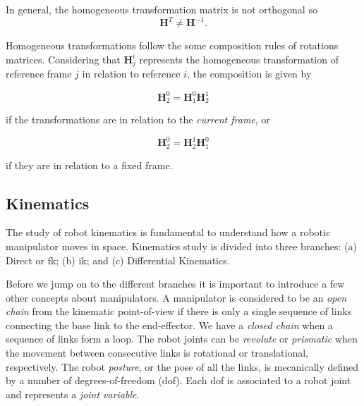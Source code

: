 In general, the homogeneous transformation matrix is not orthogonal so 
\begin{equation}
    \boldsymbol{H}^{T} \neq \boldsymbol{H}^{-1}.
\end{equation}

Homogeneous transformations follow the some composition rules of rotations matrices. Considering that $\boldsymbol{H}^{i}_{j}$ represents the homogeneous transformation of reference frame $j$ in relation to reference $i$, the composition is given by

\begin{equation}
    \boldsymbol{H}^{0}_{2} = \boldsymbol{H}^{0}_{1}\boldsymbol{H}^{1}_{2}
\end{equation}

if the transformations are in relation to the \emph{current frame}, or

\begin{equation}
    \boldsymbol{H}^{0}_{2} = \boldsymbol{H}^{1}_{2}\boldsymbol{H}^{0}_{1}
\end{equation}

if they are in relation to a fixed frame.



\subsection{Kinematics}
\label{subsec:kinematics}

The study of robot kinematics is fundamental to understand how a robotic manipulator moves in space. Kinematics study is divided into three branches: (a) Direct or \gls{fk}; (b) \gls{ik}; and (c) Differential Kinematics.\bigskip

Before we jump on to the different branches it is important to introduce a few other concepts about manipulators. A manipulator is considered to be an \emph{open chain} from the kinematic point-of-view if there is only a single sequence of links connecting the base link to the end-effector. We have a \emph{closed chain} when a sequence of links form a loop. The robot joints can be \emph{revolute} or \emph{prismatic} when the movement between consecutive links is rotational or translational, respectively. The robot \emph{posture}, or the pose of all the links, is mecanically defined by a number of degrees-of-freedom (\gls{dof}). Each \gls{dof} is associated to a robot joint and represents a \emph{joint variable}.

